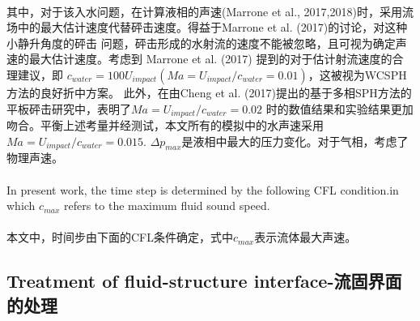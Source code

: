 \documentclass[UTF8]{ctexart}
\begin{document}
{{\paragraph{\quad}其中，对于该入水问题，在计算液相的声速(Marrone et al., 2017,2018)时，采用流
                场中的最大估计速度代替砰击速度。得益于Marrone et al. (2017)的讨论，对这种小静升角度的砰击
                问题，砰击形成的水射流的速度不能被忽略，且可视为确定声速的最大估计速度。考虑到
                Marrone et al. (2017) 提到的对于估计射流速度的合理建议，即 $c_{water} = 100U_{impact} 
                (Ma = U_{impact}/c_{water} = 0.01)$，这被视为WCSPH方法的良好折中方案。
                此外，在由Cheng et al. (2017)提出的基于多相SPH方法的平板砰击研究中，表明了$Ma = U_{impact}/c_{water} = 0.02$
                时的数值结果和实验结果更加吻合。平衡上述考量并经测试，本文所有的模拟中的水声速采用 $Ma = U_{impact}/c_{water} = 0.015$.
                $\Delta p_{max}$是液相中最大的压力变化。对于气相，考虑了物理声速。 

\paragraph{\quad}In present work, the time step is determined by the following
                CFL condition.in which $c_{max}$ refers to the maximum fluid sound speed. 
\paragraph{\quad}本文中，时间步由下面的CFL条件确定，式中$c_{max}$表示流体最大声速。



\subsection{Treatment of fluid-structure interface-流固界面的处理}
}}
\end{document}
